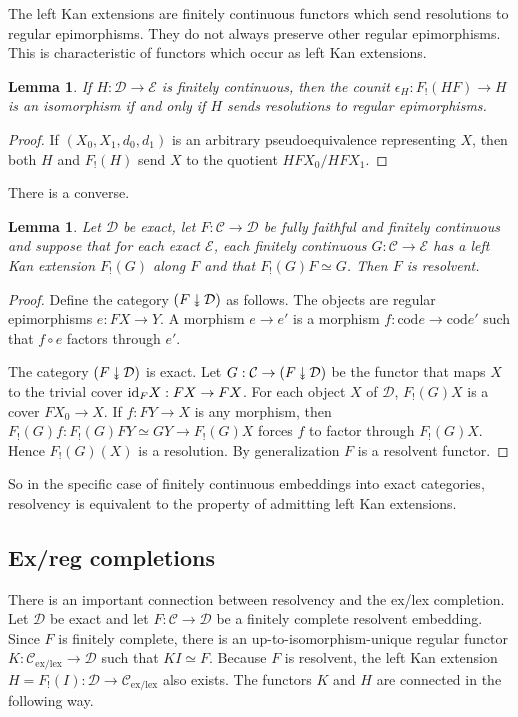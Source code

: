 \documentclass[sort&compress]{elsarticle}
\theoremstyle{plain}
\newtheorem{lemma}[theorem]{Lemma}
\theoremstyle{definition}
\theoremstyle{remark}
\newcommand\cat\mathcal
\newcommand{\downepi}{\mathbin{\rotatebox[origin=c]{-90}{$\twoheadrightarrow$}}}
\newcommand\exlex{_\mathrm{ex/lex}}
\begin{document}
The left Kan extensions are finitely continuous functors which send resolutions to regular epimorphisms. They do not always preserve other regular epimorphisms. This is characteristic of functors which occur as left Kan extensions.

\begin{lemma} If $H:\cat D\to \cat E$ is finitely continuous, then the counit $\epsilon_H:F_!(HF)\to H$ is an isomorphism if and only if $H$ sends resolutions to regular epimorphisms. \end{lemma}

\begin{proof} If $(X_0,X_1,d_0,d_1)$ is an arbitrary pseudoequivalence representing $X$, then both $H$ and $F_!(H)$ send $X$ to the quotient $HFX_0/HFX_1$. \end{proof}

There is a converse.

\begin{lemma} Let $\cat D$ be exact, let $F:\cat C\to \cat D$ be fully faithful and finitely continuous and suppose that for each exact $\cat E$, each finitely continuous $G:\cat C\to \cat E$ has a left Kan extension $F_!(G)$ along $F$ and that $F_!(G)F\simeq G$. Then $F$ is resolvent.\label{converse} \end{lemma}

\newcommand\cod{\mathrm{cod}}
\begin{proof} Define the category $(F\downepi \cat D)$ as follows. The objects are regular epimorphisms $e:FX \to Y$. A morphism $e\to e'$ is a morphism $f:\cod e \to \cod e'$ such that $f\circ e$ factors through $e'$.

The category $(F\downepi \cat D)$ is exact. Let $G:\cat C\to (F\downepi \cat D)$ be the functor that maps $X$ to the trivial cover $\mathrm{id}_FX:FX\to FX$. For each object $X$ of $\cat D$, $F_!(G)X$ is a cover $FX_0 \to X$. If $f:FY\to X$ is any morphism, then $F_!(G)f: F_!(G)FY\simeq GY \to F_!(G)X$ forces $f$ to factor through $F_!(G)X$. Hence $F_!(G)(X)$ is a resolution. By generalization $F$ is a resolvent functor.
\end{proof} %

So in the specific case of finitely continuous embeddings into exact categories, resolvency is equivalent to the property of admitting left Kan extensions.

\subsection{Ex/reg completions}
There is an important connection between resolvency and the ex/lex completion. Let $\cat D$ be exact and let $F:\cat C \to \cat D$ be a finitely complete resolvent embedding. Since $F$ is finitely complete, there is an up-to-isomorphism-unique regular functor $K:\cat C\exlex \to \cat D$ such that $KI\simeq F$. Because $F$ is resolvent, the left Kan extension $H=F_!(I):\cat D\to\cat C\exlex$ also exists. The functors $K$ and $H$ are connected in the following way.
\end{document}
